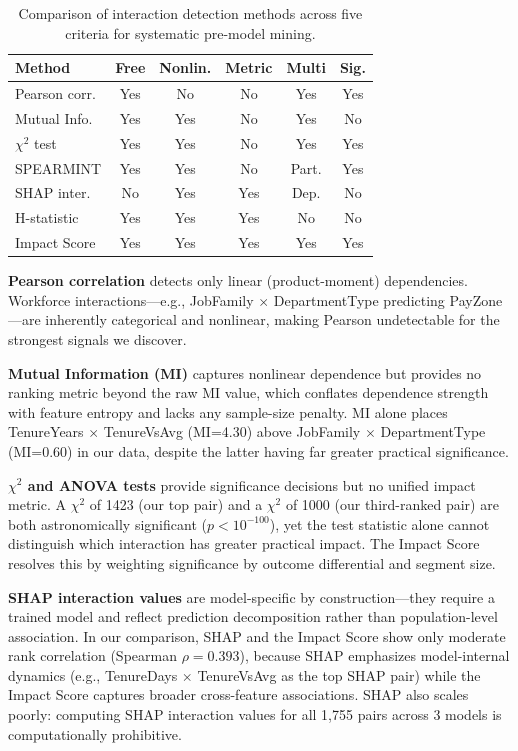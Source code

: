 \documentclass[conference]{IEEEtran}
\begin{document}
\begin{table}[htb]
\centering
\small
\renewcommand{\arraystretch}{1.15}
\caption{Comparison of interaction detection methods across five criteria for systematic pre-model mining.}
\label{tab:method_comparison}
\begin{tabular}{lccccc}
\hline
Method & Free & Nonlin. & Metric & Multi & Sig. \\
\hline
Pearson corr. & Yes & No & No & Yes & Yes \\
Mutual Info. & Yes & Yes & No & Yes & No \\
$\chi^2$ test & Yes & Yes & No & Yes & Yes \\
SPEARMINT \cite{sorokina2008detecting} & Yes & Yes & No & Part. & Yes \\
SHAP inter. \cite{lundberg2020shap} & No & Yes & Yes & Dep. & No \\
H-statistic \cite{friedman2008predictive} & Yes & Yes & Yes & No & No \\
Impact Score & Yes & Yes & Yes & Yes & Yes \\
\hline
\end{tabular}
\end{table}

\noindent\textbf{Pearson correlation} detects only linear (product-moment) dependencies. Workforce interactions---e.g., JobFamily $\times$ DepartmentType predicting PayZone---are inherently categorical and nonlinear, making Pearson undetectable for the strongest signals we discover.

\textbf{Mutual Information (MI)} captures nonlinear dependence but provides no ranking metric beyond the raw MI value, which conflates dependence strength with feature entropy and lacks any sample-size penalty. MI alone places TenureYears $\times$ TenureVsAvg (MI=4.30) above JobFamily $\times$ DepartmentType (MI=0.60) in our data, despite the latter having far greater practical significance.

\textbf{$\chi^2$ and ANOVA tests} provide significance decisions but no unified impact metric. A $\chi^2$ of 1423 (our top pair) and a $\chi^2$ of 1000 (our third-ranked pair) are both astronomically significant ($p<10^{-100}$), yet the test statistic alone cannot distinguish which interaction has greater practical impact. The Impact Score resolves this by weighting significance by outcome differential and segment size.

\textbf{SHAP interaction values} are model-specific by construction---they require a trained model and reflect prediction decomposition rather than population-level association. In our comparison, SHAP and the Impact Score show only moderate rank correlation (Spearman $\rho=0.393$), because SHAP emphasizes model-internal dynamics (e.g., TenureDays $\times$ TenureVsAvg as the top SHAP pair) while the Impact Score captures broader cross-feature associations. SHAP also scales poorly: computing SHAP interaction values for all 1,755 pairs across 3 models is computationally prohibitive.
\end{document}
